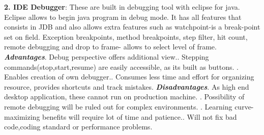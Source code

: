 \documentclass[a4paper,12pt]{article}
\begin{document}
\begin{titlepage}
\textbf{2. IDE Debugger}: These are built in debugging tool with eclipse for java. Eclipse allows to begin java program in debug mode. It has all features that consists in JDB and also allows extra features such as watchpoint-is a break-point set on field. Exception breakpoints, method breakpoints, step filter, hit count, remote debugging and drop to frame- allows to select level of frame.\newline  
\newline
\textbf{\textit{Advantages}}. Debug perspective offers additional view.. Stepping commands(stop,start,resume) are easily accessible, as its built as buttons. . Enables creation of own debugger.. Consumes less time and effort for organizing resource, provides shortcuts and track mistakes.\newline
\textbf{\textit{Disadvantages}}. As high end desktop application, these cannot run on production machine. . Possibility of remote debugging will be ruled out for complex environments. . Learning curve- maximizing benefits will require lot of time and patience.. Will not fix bad code,coding standard or performance problems.


\end{titlepage}
\end{document}
